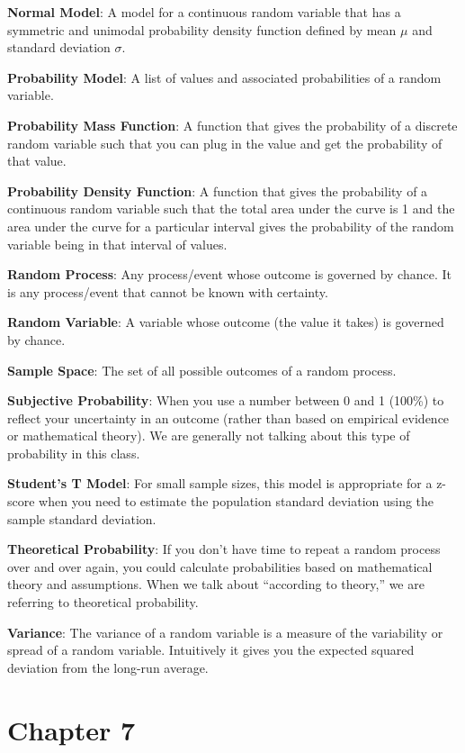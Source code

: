 \documentclass[
]{book}
\begin{document}
\textbf{Normal Model}: A model for a continuous random variable that has a symmetric and unimodal probability density function defined by mean \(\mu\) and standard deviation \(\sigma\).

\textbf{Probability Model}: A list of values and associated probabilities of a random variable.

\textbf{Probability Mass Function}: A function that gives the probability of a discrete random variable such that you can plug in the value and get the probability of that value.

\textbf{Probability Density Function}: A function that gives the probability of a continuous random variable such that the total area under the curve is 1 and the area under the curve for a particular interval gives the probability of the random variable being in that interval of values.

\textbf{Random Process}: Any process/event whose outcome is governed by chance. It is any process/event that cannot be known with certainty.

\textbf{Random Variable}: A variable whose outcome (the value it takes) is governed by chance.

\textbf{Sample Space}: The set of all possible outcomes of a random process.

\textbf{Subjective Probability}: When you use a number between 0 and 1 (100\%) to reflect your uncertainty in an outcome (rather than based on empirical evidence or mathematical theory). We are generally not talking about this type of probability in this class.

\textbf{Student's T Model}: For small sample sizes, this model is appropriate for a z-score when you need to estimate the population standard deviation using the sample standard deviation.

\textbf{Theoretical Probability}: If you don't have time to repeat a random process over and over again, you could calculate probabilities based on mathematical theory and assumptions. When we talk about ``according to theory,'' we are referring to theoretical probability.

\textbf{Variance}: The variance of a random variable is a measure of the variability or spread of a random variable. Intuitively it gives you the expected squared deviation from the long-run average.

\section{Chapter 7}\label{chapter-7}
\end{document}
